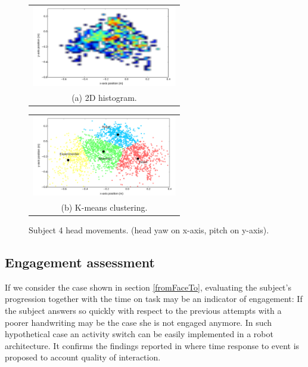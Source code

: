 \documentclass{sig-alternate}
\begin{document}
\begin{figure}
  \centering
  \begin{tabular}{@{}c@{}}
    \includegraphics[width=.7\linewidth,height=100pt]{heatmap} \\
    \small (a)  2D histogram.
  \end{tabular}

  \vspace{\floatsep}

  \begin{tabular}{@{}c@{}}
    \includegraphics[width=.7\linewidth,height=100pt]{kmeans} \\
    \small (b) K-means clustering.
  \end{tabular}

  \caption{ \small Subject 4 head movements. (head yaw on x-axis, pitch on y-axis).}
  \label{fig:heatmap}
\end{figure}

\subsection{Engagement assessment}

If we consider the case shown in section \ref{fromFaceTo}, evaluating the
subject's progression together with the time on task may be an indicator of
engagement: If the subject answers so quickly with respect to the previous
attempts with a poorer handwriting may be the case she is not engaged anymore.
In such hypothetical case an activity switch can be easily implemented in a
robot architecture. It confirms the findings reported in \cite{anzalone} where
time response to event is proposed to account quality of interaction. 
\end{document}
